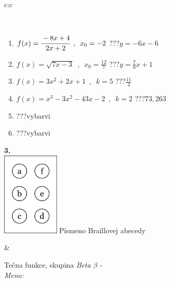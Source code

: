 \documentclass[10pt]{report}
\begin{document}
\begin{tabular}{c:c}
\begin{minipage}[c][104.5mm][t]{0.5\linewidth}
\begin{center}
\begin{minipage}{0.95\linewidth}
\end{minipage}
\\[1mm]
\begin{minipage}{0.79\linewidth}
\begin{center}
\begin{varwidth}{\linewidth}
\begin{enumerate}
\small
\item $f(x)=\cfrac{-8x+4}{2x+2}\enspace , \enspace x_0=-2$\quad \dotfill\; ???\;\dotfill \quad $y = -6x-6$
\item $f(x)=\sqrt{7x-3}\enspace , \enspace x_0=\frac{12}{7}$\quad \dotfill\; ???\;\dotfill \quad $y = \frac{7}{6}x+1$
\item $f(x)=3x^2+2x+1\enspace , \enspace k=5$\quad \dotfill\; ???\;\dotfill \quad $\frac{11}{4}$
\item $f(x)=x^3-3x^2-43x-2\enspace , \enspace k=2$\quad \dotfill\; ???\;\dotfill \quad $73 , 263$
\item \quad \dotfill\; ???\;\dotfill \quad vybarvi
\item \quad \dotfill\; ???\;\dotfill \quad vybarvi
\end{enumerate}
\end{varwidth}
\end{center}
\end{minipage}
\begin{minipage}{0.20\linewidth}
\begin{center}
{\Huge\bfseries 3.} \\[2mm]
\includegraphics[height=40mm]{../images/braille.png}
{\small Písmeno Braillovej abecedy}
\end{center}
\end{minipage}
\end{center}
\end{minipage}
&
\begin{minipage}[c][104.5mm][t]{0.5\linewidth}
\begin{center}
\vspace{7mm}
{\huge Tečna funkce, skupina \textit{Beta $\beta$} -}\\[5mm]
\textit{Meno:}\phantom{xxxxxxxxxxxxxxxxxxxxxxxxxxxxxxxxxxxxxxxxxxxxxxxxxxxxxxxxxxxxxxxxx}\\[5mm]

\end{center}
\end{minipage}
\end{tabular}
\end{document}
